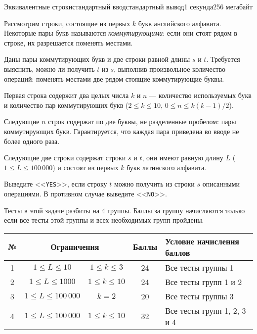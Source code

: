 \begin{problem}{Эквивалентные строки}{стандартный ввод}{стандартный вывод}{1 секунда}{256 мегабайт}

Рассмотрим строки, состоящие из первых $k$ букв английского алфавита. Некоторые пары букв называются \textit{коммутирующими}: если они стоят рядом в строке, их разрешается поменять местами.

Даны пары коммутирующих букв и две строки равной длины $s$ и $t$. Требуется выяснить, можно ли получить $t$ из $s$, выполнив произвольное количество операций: поменять местами две рядом стоящие коммутирующие буквы.

\InputFile
Первая строка содержит два целых числа $k$ и $n$ --- количество используемых букв и количество пар коммутирующих букв ($2 \le k \le 10$, $0 \le n \le k(k-1)/2$).

Следующие $n$ строк содержат по две буквы, не разделенные пробелом: пары коммутирующих букв. Гарантируется, что каждая пара приведена во вводе не более одного раза.

Следующие две строки содержат строки $s$ и $t$, они имеют равную длину $L$ ($1 \le L \le 100\,000$) и состоят из первых $k$ букв латинского алфавита.

\OutputFile
Выведите <<\texttt{YES}>>, если строку $t$ можно получить из строки $s$ описанными операциями. В противном случае выведите <<\texttt{NO}>>.

\Scoring
Тесты в этой задаче разбиты на 4 группы. Баллы за группу начисляются только если
все тесты этой группы и всех необходимых групп пройдены.

\medskip

\begin{tabular}{|c|cc|c|l|}
\hline
№ & \multicolumn{2}{c|}{Ограничения}& Баллы & Условие начисления баллов\\
\hline
1 & $1 \le L \le 10$ & $1 \le k \le 3$ & 24 & Все тесты группы 1\\
\hline
2 & $1 \le L \le 1000$ & $1 \le k \le 10$ & 24& Все тесты групп 1 и 2\\
\hline
3 & $1 \le L \le 100\,000$ & $k = 2$ & 20& Все тесты группы 3\\
\hline
4 & $1 \le L \le 100\,000$ & $1 \le k \le 10$ & 32 & Все тесты групп 1, 2, 3 и 4\\
\hline
\end{tabular}

\Examples

\begin{example}
%
%
\end{example}

\end{problem}

